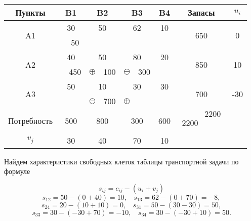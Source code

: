\documentclass[a4paper,12pt]{article}
\begin{document}
	\begin{center}
		\begin{tabular}{|c|c|c|c|c|c|c|c|c|cc}
			\hline
			Пункты & \multicolumn{2}{c|}{B1} & \multicolumn{2}{c|}{B2} & \multicolumn{2}{c|}{B3} & \multicolumn{2}{c|}{B4} & \multicolumn{1}{c|}{Запасы} & \multicolumn{1}{c|}{$u_i$} \\ \hline
			\multirow{2}{*}{A1} & \multicolumn{2}{c|}{30} & \multicolumn{2}{c|}{50} & \multicolumn{2}{c|}{62} & \multicolumn{2}{c|}{10} & \multicolumn{1}{c|}{\multirow{2}{*}{650}} & \multicolumn{1}{c|}{\multirow{2}{*}{0}} \\ \cline{2-9}
			&  & 50 &  &  &  &  &  &  & \multicolumn{1}{c|}{} & \multicolumn{1}{c|}{} \\ \hline
			\multirow{2}{*}{A2} & \multicolumn{2}{c|}{40} & \multicolumn{2}{c|}{50} & \multicolumn{2}{c|}{80} & \multicolumn{2}{c|}{20} & \multicolumn{1}{c|}{\multirow{2}{*}{850}} & \multicolumn{1}{c|}{\multirow{2}{*}{10}} \\ \cline{2-9}
			&  & 450 & \textbf{$\oplus$} & 100 & \textbf{$\ominus$} & 300 &  &  & \multicolumn{1}{c|}{} & \multicolumn{1}{c|}{} \\ \hline
			\multirow{2}{*}{A3} & \multicolumn{2}{c|}{50} & \multicolumn{2}{c|}{10} & \multicolumn{2}{c|}{30} & \multicolumn{2}{c|}{30} & \multicolumn{1}{c|}{\multirow{2}{*}{700}} & \multicolumn{1}{c|}{\multirow{2}{*}{-30}} \\ \cline{2-9}
			&  &  & \textbf{$\ominus$} & 700 & \textbf{$\oplus$} &  &  &  & \multicolumn{1}{c|}{} & \multicolumn{1}{c|}{} \\ \hline
			Потребность & \multicolumn{2}{c|}{500} & \multicolumn{2}{c|}{800} & \multicolumn{2}{c|}{300} & \multicolumn{2}{c|}{600} & \multicolumn{1}{c|}{$\begin{matrix}
					& 2200 \\
					2200 & \\
				\end{matrix}$} &  \\ \cline{1-10}
			$v_j$ & \multicolumn{2}{c|}{30} & \multicolumn{2}{c|}{40} & \multicolumn{2}{c|}{70} & \multicolumn{2}{c|}{10} &  &  \\ \cline{1-9}
		\end{tabular}
	\end{center}
	
	Найдем характеристики свободных клеток таблицы транспортной задачи по формуле
	
	\[
		s_{ij} = c_{ij} - (u_i + v_j) 
	\]
	\[
		s_{12} = 50 - (0 + 40) = 10, \ \ \ \ s_{13} = 62 - (0 + 70) = -8,
	\]
	\[
		s_{24} = 20 - (10 + 10) = 0, \ \ \ \ s_{31} = 50 - (30 - 30) = 50,
	\]
	\[
		s_{33} = 30 - (-30 + 70) = -10, \ \ \ \ s_{34} = 30 - (-30 + 10) = 50.
	\]
	
\end{document}
